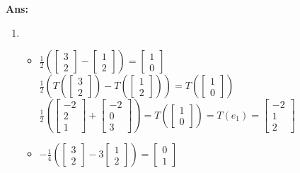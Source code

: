 \documentclass[12pt,a4paper]{amsart}
\newcommand\sol[1]{
\medskip
\begin{mdframed}
\textbf{Ans:\\} #1
\end{mdframed}
\medskip
}
\begin{document}
\begin{enumerate}
\sol{
  \begin{enumerate}
    \item
    \begin{itemize}
      \item $\frac{1}{2}(\left[\begin{matrix} 3 \\ 2 \end{matrix}\right]-\left[\begin{matrix} 1 \\ 2 \end{matrix}\right])=\left[\begin{matrix} 1 \\ 0 \end{matrix}\right]$\\
            $\frac{1}{2}(T(\left[\begin{matrix} 3 \\ 2 \end{matrix}\right])-T(\left[\begin{matrix} 1 \\ 2 \end{matrix}\right]))=T(\left[\begin{matrix} 1 \\ 0 \end{matrix}\right])$\\
            $\frac{1}{2}(\left[\begin{matrix} -2 \\ 2 \\ 1 \end{matrix}\right]+\left[\begin{matrix} -2 \\ 0 \\ 3 \end{matrix}\right])=T(\left[\begin{matrix} 1 \\ 0 \end{matrix}\right])=T(e_1)=\left[\begin{matrix} -2 \\ 1 \\ 2 \end{matrix}\right]$\\
      \item $-\frac{1}{4}(\left[\begin{matrix} 3 \\ 2 \end{matrix}\right]-3\left[\begin{matrix} 1 \\ 2 \end{matrix}\right])=\left[\begin{matrix} 0 \\ 1 \end{matrix}\right]$\\

\end{itemize}
\end{enumerate}}
\end{enumerate}
\end{document}
